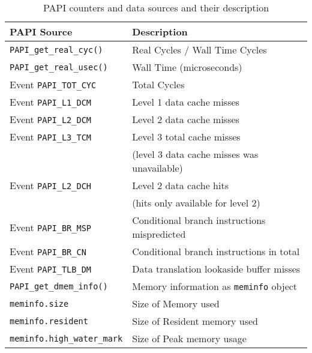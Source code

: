 \begin{table}
\caption{PAPI counters and data sources and their description}
\label{papievents}
\center
\begin{tabular}{|l|l|}
\hline
\textbf{PAPI Source}	& \textbf{Description} \\ \hline
\texttt{PAPI\_get\_real\_cyc()}	& Real Cycles / Wall Time Cycles \\ \hline
\texttt{PAPI\_get\_real\_usec()}	& Wall Time (microseconds) \\ \hline
Event \texttt{PAPI\_TOT\_CYC}	& Total Cycles \\ \hline
Event \texttt{PAPI\_L1\_DCM}		& Level 1 data cache misses \\ \hline
Event \texttt{PAPI\_L2\_DCM}		& Level 2 data cache misses \\ \hline
Event \texttt{PAPI\_L3\_TCM}		& Level 3 total cache misses\\
& (level 3 data cache misses was unavailable) \\ \hline
Event \texttt{PAPI\_L2\_DCH}		& Level 2 data cache hits \\
& (hits only available for level 2) \\ \hline
Event \texttt{PAPI\_BR\_MSP}		& Conditional branch instructions mispredicted \\ \hline
Event \texttt{PAPI\_BR\_CN}		& Conditional branch instructions in total \\ \hline
Event \texttt{PAPI\_TLB\_DM}		& Data translation lookaside buffer misses \\ \hline
\texttt{PAPI\_get\_dmem\_info()}	& Memory information as \texttt{meminfo} object \\ \hline
\texttt{meminfo.size}			& Size of Memory used \\ \hline
\texttt{meminfo.resident}		& Size of Resident memory used \\ \hline
\texttt{meminfo.high\_water\_mark}	& Size of Peak memory usage \\ \hline

\end{tabular}
\end{table}
